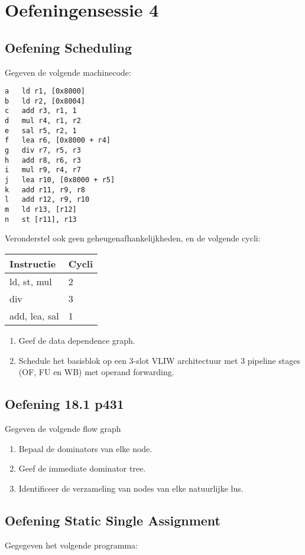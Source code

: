 \chapter{Oefeningensessie 4}


\section{Oefening Scheduling}

Gegeven de volgende machinecode:
\begin{lstlisting}
a	ld r1, [0x8000]
b	ld r2, [0x8004]
c	add r3, r1, 1
d	mul r4, r1, r2
e	sal r5, r2, 1
f	lea r6, [0x8000 + r4]
g	div r7, r5, r3
h	add r8, r6, r3
i	mul	r9, r4, r7
j	lea r10, [0x8000 + r5]
k	add r11, r9, r8
l	add r12, r9, r10
m	ld r13, [r12]
n	st [r11], r13
\end{lstlisting}
Veronderstel ook geen geheugenafhankelijkheden, en de volgende cycli:
\begin{table}
	\begin{tabular}{| l | l |}
		\hline 
		\textbf{Instructie} & \textbf{Cycli} \\
		\hline
		ld, st, mul & 2 \\
		div & 3 \\
		add, lea, sal & 1
	\end{tabular}
\end{table}

\begin{enumerate}
	\item Geef de data dependence graph.
	\item Schedule het basisblok op een 3-slot VLIW architectuur met 3 pipeline stages (OF, FU en WB) met operand forwarding.
	
\end{enumerate}

\section{Oefening 18.1 p431}
Gegeven de volgende flow graph

\begin{enumerate}
	\item Bepaal de dominators van elke node.
	\item Geef de immediate dominator tree.
	\item Identificeer de verzameling van nodes van elke natuurlijke lus.
\end{enumerate}

\section{Oefening Static Single Assignment}
Gegegeven het volgende programma:


